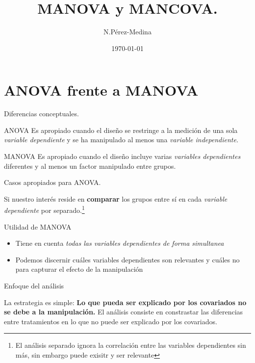 \documentclass[11pt]{beamer}
\author{N.Pérez-Medina}
\title{\textbf{MANOVA y MANCOVA.}}
\institute{\textbf{FING - UACH}
	\\
	\begin{small}
	\textit{Análisis multivariado}\\
	\textbf{Catedrático:} M. C. Erick N. Grijalva 
	\end{small}		
	}
\date{\today}
\begin{document}
\begin{frame}
	\titlepage
\end{frame}

\begin{frame}
	\tableofcontents
\end{frame}

\section{ANOVA frente a MANOVA}
\begin{frame}{Diferencias conceptuales.}
	\begin{block}{ANOVA}
		Es apropiado cuando el diseño se restringe a la medición de una sola \textit{variable dependiente} y se ha manipulado al menos una \textit{variable independiente.}
	\end{block}
	\begin{block}{MANOVA}
		Es apropiado cuando el diseño incluye varias \textit{variables dependientes} diferentes y al menos un factor manipulado entre grupos.
	\end{block}

\end{frame}

\begin{frame}{Casos apropiados para ANOVA.}
	\begin{block}{}
		Si nuestro interés reside en \textbf{comparar} los grupos entre sí en cada \textit{variable dependiente} por separado.\footnote{El análisis separado ignora la correlación entre las variables dependientes sin más, sin embargo puede exisitr y ser relevante}
	\end{block}
	
\end{frame}

\begin{frame}{Utilidad de MANOVA}
	\begin{block}{}
		\begin{itemize}
			\item Tiene en cuenta \textit{todas las variables dependientes de forma simultanea}
			\item Podemos discernir cuáles variables dependientes son relevantes y cuáles no para capturar el efecto de la manipulación 
		\end{itemize}
		
	\end{block}
\end{frame}

\begin{frame}{Enfoque del análisis}
	\begin{block}{La estrategia es simple:}
		\textbf{Lo que pueda ser explicado por los covariados no se debe a la manipulación.} El análisis consiste en constrastar las diferencias entre tratamientos en lo que no puede ser explicado por los covariados.
	\end{block}
\end{frame}
\end{document}
